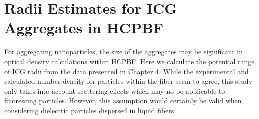 \label{AppendixA}
\chapter{Radii Estimates for ICG Aggregates in HCPBF }
For aggregating nanoparticles, the size of the aggregates may be significant in optical density calculations within HCPBF. Here we calculate the potential range of ICG radii from the data presented in Chapter 4. While the experimental and calculated number density for particles within the fiber seem to agree, this study only takes into account scattering effects which may no be applicable to fluorescing particles. However, this assumption would certainly be valid when considering dielectric particles dispersed in liquid fibers. \\

